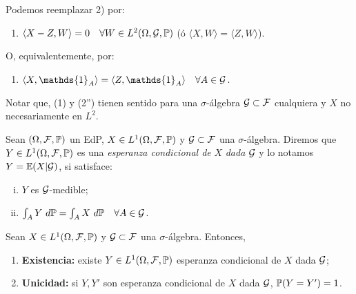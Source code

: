 Podemos reemplazar 2) por:
\begin{enumerate}
	\item[2')] $\langle X - Z, W \rangle = 0 \quad \forall W \in L^{2}(\Omega, \mathcal{G}, \mathbb{P})$ (ó $\langle X,W \rangle = \langle Z, W \rangle$).
\end{enumerate}
O, equivalentemente, por: 
\begin{enumerate}
	\item[2'')] $\langle X, \mathds{1}_{A} \rangle = \langle Z, \mathds{1}_{A} \rangle \quad \forall A \in \mcal{G}$.
\end{enumerate}
Notar que, (1) y (2'') tienen sentido para una $\sigma$-álgebra $\mathcal{G} \subset \mathcal{F}$ cualquiera y $X$ no necesariamente en $L^{2}$.

\begin{definition}
	Sean $(\Omega, \mathcal{F}, \mathbb{P})$ un EdP, $X \in L^{1}(\Omega, \mathcal{F}, \mathbb{P})$ y $\mathcal{G} \subset \mathcal{F}$ una $\sigma$-álgebra. Diremos que $Y \in L^{1}(\Omega, \mathcal{F}, \mathbb{P})$ es una \textit{esperanza condicional de } $X$ \textit{dada} $\mathcal{G}$ y lo notamos $Y = \mathbb{E}(X | \mathcal{G})$, si satisface:
	\begin{enumerate}[i)]
		\item $Y$ es $\mathcal{G}$-medible;

		\item $\int_{A} Y \ d\mbb{P} = \int_{A} X \ d\mbb{P} \quad \forall A \in \mcal{G}$.
	\end{enumerate}
\end{definition}

\begin{theorem}
	Sean $X \in L^{1}(\Omega, \mathcal{F}, \mathbb{P})$ y $\mathcal{G} \subset \mathcal{F}$ una $\sigma$-álgebra. Entonces,
	\begin{enumerate}
		\item \textbf{Existencia:} existe $Y \in L^{1}(\Omega, \mathcal{F}, \mathbb{P})$ esperanza condicional de $X$ dada $\mathcal{G}$;

		\item \textbf{Unicidad:} si $Y,Y'$ son esperanza condicional de $X$ dada $\mathcal{G}$, $\mathbb{P}(Y = Y') = 1$.
	\end{enumerate}
\end{theorem}
